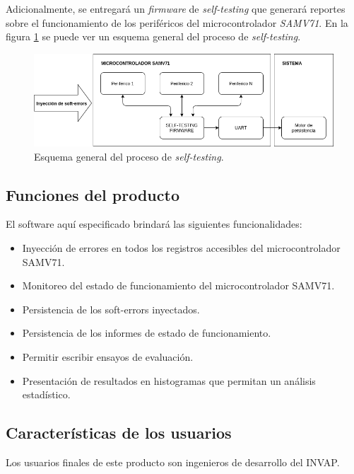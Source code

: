 \documentclass[
11pt, %
codirector, %
]{charter}
\begin{document}
Adicionalmente, se entregará un \emph{firmware} de \emph{self-testing} que generará reportes sobre el funcionamiento de los periféricos del microcontrolador \emph{SAMV71}.
En la figura \ref{fig:esqSelfTesting} se puede ver un esquema general del proceso de \emph{self-testing}.

\begin{figure}[h]
	\centering
	\includegraphics[width=\textwidth]{./Figuras/selfTesting.png}
	\caption{Esquema general del proceso de \emph{self-testing}.}
	\label{fig:esqSelfTesting}
\end{figure}

\subsection{Funciones del producto}
\label{sub:funcionesProducto}

El software aquí especificado brindará las siguientes funcionalidades:

\begin{itemize}
	\item Inyección de errores en todos los registros accesibles del microcontrolador SAMV71.
	\item Monitoreo del estado de funcionamiento del microcontrolador SAMV71.
	\item Persistencia de los soft-errors inyectados.
	\item Persistencia de los informes de estado de funcionamiento.
	\item Permitir escribir ensayos de evaluación.
	\item Presentación de resultados en histogramas que permitan un análisis estadístico.
\end{itemize}

\subsection{Características de los usuarios}
\label{sub:usuarios}

Los usuarios finales de este producto son ingenieros de desarrollo del INVAP.
\end{document}
